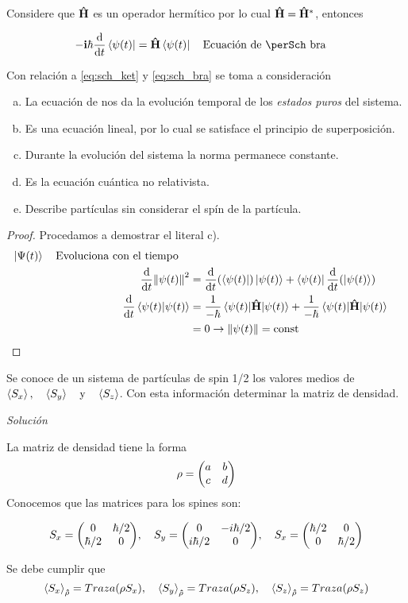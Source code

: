 Considere que $\vu{H}$ es un operador hermítico por lo cual $\vu{H}=\vu{H}^*$, entonces

\begin{equation}
\centering
   -\vb{i}\hbar\dv{t}\bra{\psi(t)}=\vu{H}\bra{\psi(t)}\qq{Ecuación de \perSch bra}
   \label{eq:sch_bra}
\end{equation}

Con relación a \autoref{eq:sch_ket} y \autoref{eq:sch_bra} se toma a consideración 

\begin{enumerate}[a)]
    \item La ecuación de \perSch nos da la evolución temporal de los \textit{estados puros} del sistema.
    \item Es una ecuación lineal, por lo cual se satisface el principio de superposición.
    \item Durante la evolución del sistema la norma permanece constante.
    \item Es la ecuación cuántica no relativista.
    \item Describe partículas sin considerar el spín de la partícula.
\end{enumerate}
\begin{proof}
    Procedamos a demostrar el literal c).
    \begin{align*}
        \ket{\Psi(t)}\qq{Evoluciona con el tiempo}\\
        \dv{t}\norm{\psi(t)}^2&=\dv{t}(\bra{\psi(t)})\ket{\psi(t)}+\bra{\psi(t)}\dv{t}(\ket{\psi(t)})\\
        \dv{t}\braket{\psi(t)}&=\frac{1}{-\hbar}\mel{\psi(t)}{\vu{H}}{\psi(t)}+\frac{1}{-\hbar}\mel{\psi(t)}{\vu{H}}{\psi(t)}\\
        &=0\then\norm{\psi(t)}=\text{const}
    \end{align*}
\end{proof}



\begin{example}[]
    Se conoce de un sistema de partículas de spin 1/2 los valores medios de $\expval{S_x}\qc\expval{S_y}\qq{y}\expval{S_z}$. Con esta información determinar la matriz de densidad.
    
    \textit{Solución}
    
    La matriz de densidad tiene la forma
    \[
    \rho=\mqty(a&b\\c&d)
    \]
    Conocemos que las matrices para los spines son:
    
    \[
    S_x=\mqty(0&\hbar/2\\\hbar/2&0)\qc S_y=\mqty(0&-i\hbar/2\\i\hbar/2&0)\qc S_x=\mqty(\hbar/2&0\\0&\hbar/2)
    \]
    
    Se debe cumplir que
    \[
    \expval{S_x}_{\vu{\rho}}=Traza(\rho S_x)\qc\expval{S_y}_{\vu{\rho}}=Traza(\rho S_z)\qc\expval{S_z}_{\vu{\rho}}=Traza(\rho S_z)
    \]
\end{example}

